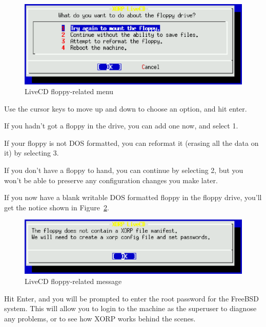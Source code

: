 \begin{figure}[h]
  \begin{center}
    \includegraphics[width=6.0in]{figs/cd2}
    \caption{LiveCD floppy-related menu}
    \label{fig:livecd:cd2}
  \end{center}
\end{figure}


Use the cursor keys to move up and down to choose an option, and hit enter.

If you hadn't got a floppy in the drive, you can add one now, and select 1.

If your floppy is not DOS formatted, you can reformat it (erasing all the data
on it) by selecting 3.

If you don't have a floppy to hand, you can continue by selecting 2,
but you won't be able to preserve any configuration changes you make
later.

If you now have a blank writable DOS formatted floppy in the floppy
drive, you'll get the notice shown in Figure~\ref{fig:livecd:cd3}.

\begin{figure}[h]
  \begin{center}
    \includegraphics[width=6.0in]{figs/cd3}
    \caption{LiveCD floppy-related message}
    \label{fig:livecd:cd3}
  \end{center}
\end{figure}

Hit Enter, and you will be prompted to enter the root password for the
FreeBSD system.  This will allow you to login to the machine as the
superuser to diagnose any problems, or to see how XORP works behind
the scenes.

